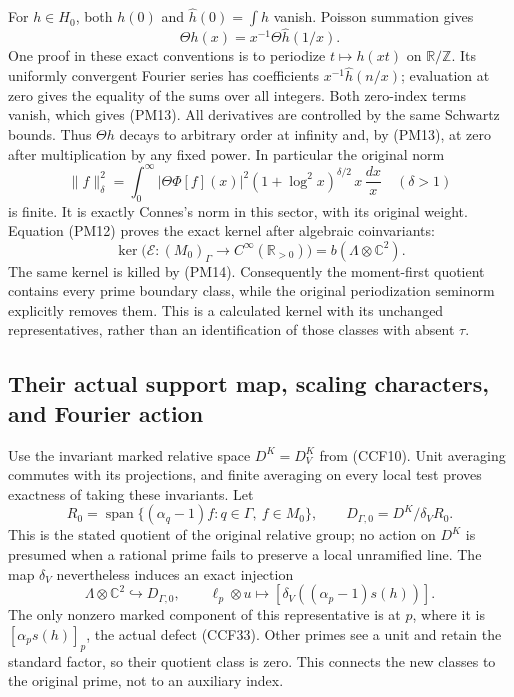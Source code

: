 \documentclass[11pt,a4paper]{article}
\theoremstyle{definition}\newtheorem{definition}[theorem]{Definition}
\begin{document}
For $h\in H_0$, both $h(0)$ and $\widehat h(0)=\int h$ vanish.
Poisson summation gives
\[
 \Theta h(x)=x^{-1}\Theta\widehat h(1/x).
 \tag{PM13}
\]
One proof in these exact conventions is to periodize
$t\mapsto h(xt)$ on $\mathbb R/\mathbb Z$. Its uniformly
convergent Fourier series has coefficients
$x^{-1}\widehat h(n/x)$; evaluation at zero gives the equality
of the sums over all integers. Both zero-index terms vanish,
which gives (PM13). All derivatives are controlled by the
same Schwartz bounds. Thus $\Theta h$ decays to arbitrary
order at infinity and, by (PM13), at zero after multiplication
by any fixed power. In particular the original norm
\[
 \|f\|_\delta^2=
   \int_0^\infty |\Theta\Phi[f](x)|^2
          (1+\log^2x)^{\delta/2}\,x\,\frac{dx}{x}
 \quad(\delta>1)
 \tag{PM14}
\]
is finite. It is exactly Connes's norm in this sector, with
its original weight. Equation (PM12) proves the exact kernel
after algebraic coinvariants:
\[
 \ker\bigl(\mathcal E:(M_0)_\Gamma\to
               C^\infty(\mathbb R_{>0})\bigr)
       =b(\Lambda\otimes\mathbb C^2).
 \tag{PM15}
\]
The same kernel is killed by (PM14). Consequently the
moment-first quotient contains every prime boundary class,
while the original periodization seminorm explicitly removes
them. This is a calculated kernel with its unchanged
representatives, rather than an identification of those classes
with absent $\tau$.

\subsection{Their actual support map, scaling characters, and Fourier action}

Use the invariant marked relative space $D^K=D_V^K$ from
(CCF10). Unit averaging commutes with its projections, and
finite averaging on every local test proves exactness of
taking these invariants. Let
\[
 R_0=\operatorname{span}\{(\alpha_q-1)f:
            q\in\Gamma,\ f\in M_0\},\qquad
 D_{\Gamma,0}=D^K/\delta_VR_0.
 \tag{PM16}
\]
This is the stated quotient of the original relative group;
no action on $D^K$ is presumed when a rational prime fails
to preserve a local unramified line. The map $\delta_V$
nevertheless induces an exact injection
\[
 \Lambda\otimes\mathbb C^2\hookrightarrow D_{\Gamma,0},
 \qquad \ell_p\otimes u\longmapsto
             [\delta_V((\alpha_p-1)s(h))].
 \tag{PM17}
\]
The only nonzero marked component of this representative is
at $p$, where it is $[\alpha_ps(h)]_p$, the actual defect
(CCF33). Other primes see a unit and retain the standard
factor, so their quotient class is zero. This connects the
new classes to the original prime, not to an auxiliary index.
\end{document}
